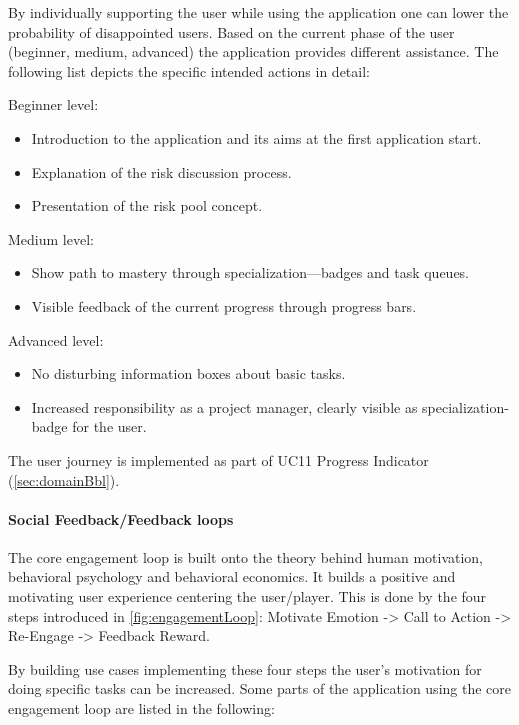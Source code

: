 By individually supporting the user while using the application one can lower the probability of disappointed users. Based on the current phase of the user (beginner, medium, advanced) the application provides different assistance. The following list depicts the specific intended actions in detail:

\noindent
Beginner level:
\begin{itemize}
	\item Introduction to the application and its aims at the first application start.
	\item Explanation of the risk discussion process.
	\item Presentation of the risk pool concept.
\end{itemize}

\noindent
Medium level:
\begin{itemize}
	\item Show path to mastery through specialization—badges and task queues.
	\item Visible feedback of the current progress through progress bars.
\end{itemize}

\noindent
Advanced level:
\begin{itemize}
	\item No disturbing information boxes about basic tasks.
	\item Increased responsibility as a project manager, clearly visible as specialization-badge for the user.
\end{itemize}

\noindent
The user journey is implemented as part of \ac{UC}11 Progress Indicator (\ref{sec:domainBbl}).

\paragraph*{Social Feedback/Feedback loops}

The core engagement loop is built onto the theory behind human motivation, behavioral psychology and behavioral economics. It builds a positive and motivating user experience centering the user/player. This is done by the four steps introduced in \ref{fig:engagementLoop}: Motivate Emotion -> Call to Action -> Re-Engage -> Feedback Reward. 

By building use cases implementing these four steps the user's motivation for doing specific tasks can be increased. Some parts of the application using the core engagement loop are listed in the following:

